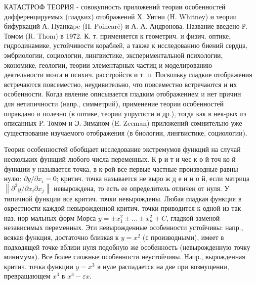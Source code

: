\documentclass[10pt]{article}
\begin{document}
КАТАСТРОФ ТЕОРИЯ - совокупность приложений теории особенностей дифференцируемых (гладких) отображений Х. Уитни (H. Whitney) и теории бифуркаций А. Пуанкаpe (Н. Poincaré) и А. А. Андронова. Название введено Р. Томом (R. Thom) в 1972. К. т. применяется к геометрич. и физич. оптике, гидродинамике, устойчивости кораблей, а также к исследованию биений сердца, эмбриологии, социологии, лингвистике, экспериментальной психологии, экономике, геологии, теории элементарных частиц и моделированию деятельности мозга и психич. расстройств и т. п. Поскольку гладкие отображения встречаются повсеместно, неудивительно, что повсеместно встречаются и их особенности. Когда явление описывается гладким отображением и нет причин для нетипичности (напр., симметрий), применение теории особенностей оправдано и полезно (в оптике, теории упругости и др.), тогда как в нек-рых из описанных P. Томом и Э. Зиманом (E. Zeeman) приложений сомнительно уже существование изучаемого отображения (в биологии, лингвистике, социологии).



Теория особенностей обобщает исследование экстремумов функций на случай нескольких функций любого числа переменных. К р и т и чес к о й точ ко й функции у называется точка, в к-рой все первые частные производные равны нулю: $\partial y / \partial x_{i}=0$; критич. точка называется не выро ж д е н н о й, если матрица $\left\|\partial^{2} y / \partial x_{i} \partial x_{j}\right\|$ невырождена, то есть ее определитель отличен от нуля. У типичной функции все критич. точки невырождены. Любая гладкая функция в окрестности каждой невырожденной критич. точки приводится к одной из так наз. нор мальных форм Морса $y= \pm x_{1}^{2} \pm \ldots \pm x_{n}^{2}+C$, гладкой заменой независимых переменных. Эти невырожденные особенности устойчивы: напр., всякая функция, достаточно близкая к $y=x^{2}$ (с производными), имеет в подходящей точке вблизи нуля подобную же особенность (невырожденную точку минимума). Все более сложные особенности неустойчивы. Напр., вырожденная критич. точка функции $y=x^{3}$ в нуле распадается на две при возмущении, превращающем $x^{3}$ в $x^{3}-\varepsilon x$.
\end{document}
